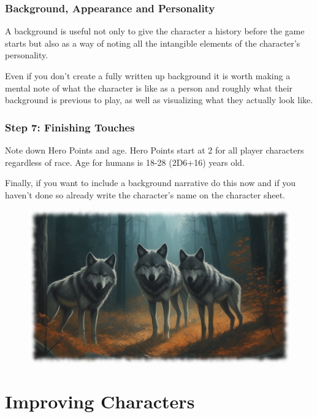 \subsubsection{Background, Appearance and Personality}
A background is useful not only to give the character a history before the game starts but also as a way of noting all the intangible elements of the character’s personality. 

Even if you don’t create a fully written up background it is worth making a mental note of what the character is like as a person and roughly what their background is previous to play, as well as visualizing what they actually look like. 

\subsubsection{Step 7: Finishing Touches}
Note down Hero Points and age. Hero Points start at 2 for all player characters regardless of race. Age for humans is 18-28 (2D6+16) years old.

Finally, if you want to include a background narrative do this now and if you haven’t done so already write the character’s name on the character sheet.


\begin{figure}%
\begin{center}
  \includegraphics[scale=0.52]{img/ai-images/wolves-forest.png}
\end{center}
\end{figure}

\section{Improving Characters}

